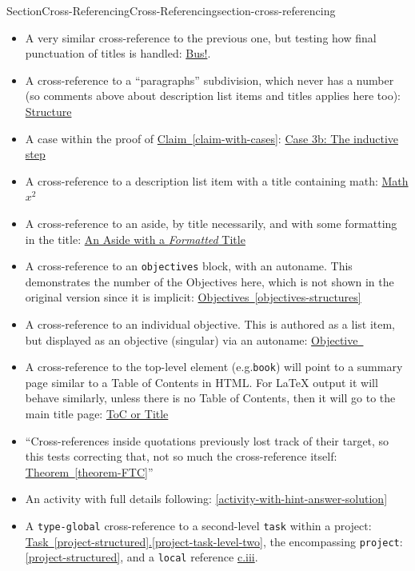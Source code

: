 \documentclass[twoside,10pt,]{article}
\newcommand{\xreffont}{\relax}
\newcommand{\mono}[1]{\texttt{#1}}
\numberwithin{equation}{section}
\begin{document}
\begin{sectionptx}{Section}{Cross-Referencing}{}{Cross-Referencing}{}{}{section-cross-referencing}
\begin{itemize}[label=\textbullet]
\item{}A very similar cross-reference to the previous one, but testing how final punctuation of titles is handled: \hyperlink{bus-definition}{Bus!}.%
\item{}A cross-reference to a ``paragraphs'' subdivision, which never has a number (so comments above about description list items and titles applies here too): \hyperlink{hierarchy-structure}{Structure}%
\item{}A case within the proof of \hyperref[claim-with-cases]{Claim~{\xreffont\ref{claim-with-cases}}}: \hyperlink{inductive-step}{Case 3b: The inductive step}%
\item{}A cross-reference to a description list item with a title containing math: \hyperlink{description-list-math-title}{Math \(x^2\)}%
\item{}A cross-reference to an aside, by title necessarily, and with some formatting in the title: \hyperref[an-aside]{An Aside with a \emph{Formatted} Title}%
\item{}A cross-reference to an \mono{objectives} block, with an autoname.  This demonstrates the number of the Objectives here, which is not shown in the original version since it is implicit: \hyperref[objectives-structures]{Objectives~{\xreffont\ref{objectives-structures}}}%
\item{}A cross-reference to an individual objective.  This is authored as a list item, but displayed as an objective (singular) via an autoname: \hyperlink{objective-structure}{Objective~{\xreffont 4.1}}%
\item{}A cross-reference to the top-level element (e.g.\@\mono{book}) will point to a summary page similar to a Table of Contents in HTML.  For LaTeX output it will behave similarly, unless there is no Table of Contents, then it will go to the main title page:  \hyperlink{derivatives}{ToC or Title}%
\item{}``Cross-references inside quotations previously lost track of their target, so this tests correcting that, not so much the cross-reference itself: \hyperref[theorem-FTC]{Theorem~{\xreffont\ref{theorem-FTC}}}''%
\item{}An activity with full details following: \hyperref[activity-with-hint-answer-solution]{{\xreffont\ref{activity-with-hint-answer-solution}}}%
\item{}A \mono{type-global} cross-reference to a second-level \mono{task} within a project: \hyperref[project-task-level-two]{Task~{\xreffont\ref{project-structured}}.{\xreffont\ref{project-task-level-two}}}, the encompassing \mono{project}: \hyperref[project-structured]{{\xreffont\ref{project-structured}}}, and a \mono{local} reference \hyperref[project-task-level-two]{c.iii}.%

\end{itemize}
\end{sectionptx}
\end{document}
